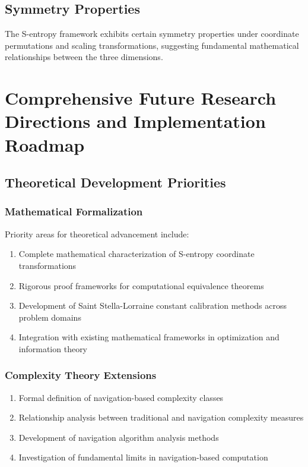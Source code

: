 \documentclass[11pt]{article}
\theoremstyle{definition}
\theoremstyle{remark}
\begin{document}
\subsection{Symmetry Properties}

The S-entropy framework exhibits certain symmetry properties under coordinate permutations and scaling transformations, suggesting fundamental mathematical relationships between the three dimensions.

\section{Comprehensive Future Research Directions and Implementation Roadmap}

\subsection{Theoretical Development Priorities}

\subsubsection{Mathematical Formalization}

Priority areas for theoretical advancement include:

\begin{enumerate}
\item Complete mathematical characterization of S-entropy coordinate transformations
\item Rigorous proof frameworks for computational equivalence theorems
\item Development of Saint Stella-Lorraine constant calibration methods across problem domains
\item Integration with existing mathematical frameworks in optimization and information theory
\end{enumerate}

\subsubsection{Complexity Theory Extensions}

\begin{enumerate}
\item Formal definition of navigation-based complexity classes
\item Relationship analysis between traditional and navigation complexity measures
\item Development of navigation algorithm analysis methods
\item Investigation of fundamental limits in navigation-based computation
\end{enumerate}
\end{document}
